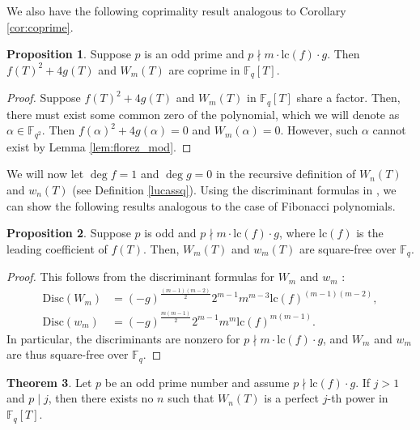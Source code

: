 \documentclass[letterpaper, 10pt]{article}
\newcommand{\lc}{\mathrm{lc}}
\newcommand{\bF}{\mathbb{F}}
\newcommand{\1}{\mathds{1}}	%
\theoremstyle{definition}
\newtheorem{theorem}{Theorem}[section]
\newtheorem{proposition}[theorem]{Proposition}
\theoremstyle{remark}
\begin{document}
We also have the following coprimality result analogous to Corollary \ref{cor:coprime}.
\begin{proposition}
\label{prop:Wmcoprime}
    Suppose $p$ is an odd prime and $p \nmid m \cdot \lc(f) \cdot g$. Then $f(T)^2 + 4g(T)$ and $W_m(T)$ are coprime in $\mathbb{F}_q[T]$.
\end{proposition}

\begin{proof}
    Suppose $f(T)^2 + 4g(T)$ and $W_m(T)$ in $\mathbb{F}_q[T]$ share a factor. Then, there must exist some common zero of the polynomial, which we will denote as $\alpha \in \bF_{q^2}$.
    Then $f(\alpha)^2 + 4g(\alpha) = 0$ and \(W_m(\alpha) = 0\).
    However, such \(\alpha\) cannot exist by Lemma \ref{lem:florez_mod}.
\end{proof}

We will now let $\deg f = 1$ and $\deg g = 0$ in the recursive definition of $W_n(T)$ and $w_n(T)$ (see Definition \ref{lucassq}). Using the discriminant formulas in \cite{florez2019resultant}, we can show the following results analogous to the case of Fibonacci polynomials.

\begin{proposition}
    \label{prop:Wwsqfree}
    Suppose $p$ is odd and $p \nmid m \cdot \lc(f) \cdot g$, where $\lc(f)$ is the leading coefficient of $f(T)$. Then, $W_m(T)$ and $w_m(T)$ are square-free over $\mathbb{F}_q$.
\end{proposition}

\begin{proof}
    This follows from the discriminant formulas for $W_m$ and $w_m$ \cite[Theorem 4, Theorem 5]{florez2019resultant}:
    \begin{align*}
        \mathrm{Disc}(W_m) &= (-g)^{\frac{(m-1)(m-2)}{2}} 2^{m-1} m^{m-3} \lc(f)^{(m-1)(m-2)}, \\
        \mathrm{Disc}(w_m) &= (-g)^{\frac{m(m-1)}{2}} 2^{m-1} m^{m} \lc(f)^{m(m-1)} \text{.}
    \end{align*}
    In particular, the discriminants are nonzero for $p \nmid m \cdot \lc(f) \cdot g$, and $W_m$ and $w_m$ are thus square-free over $\mathbb{F}_q$.
\end{proof}



\begin{theorem}
    Let $p$ be an odd prime number and assume $p \nmid \lc(f) \cdot g$. If $j > 1$ and $p \mid j$, then there exists no $n$ such that $W_n(T)$ is a perfect $j$-th power in $\mathbb{F}_q[T]$.
\end{theorem}
\end{document}
